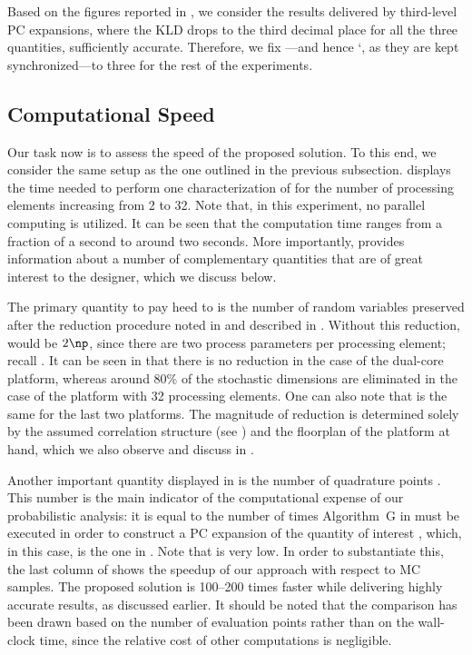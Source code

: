 Based on the figures reported in , we consider
the results delivered by third-level \ac{PC} expansions, where the \ac{KLD}
drops to the third decimal place for all the three quantities, sufficiently
accurate. Therefore, we fix \lc---and hence \lq, as they are kept
synchronized---to three for the rest of the experiments.

\subsection{Computational Speed}

Our task now is to assess the speed of the proposed solution. To this end, we
consider the same setup as the one outlined in the previous subsection.
 displays the time needed to perform one
characterization of \vg for the number of processing elements \np increasing
from 2 to 32. Note that, in this experiment, no parallel computing is utilized.
It can be seen that the computation time ranges from a fraction of a second to
around two seconds. More importantly,  provides
information about a number of complementary quantities that are of great
interest to the designer, which we discuss below.

The primary quantity to pay heed to is the number of random variables \nz
preserved after the reduction procedure noted in  and
described in . Without this reduction, \nz
would be $2 \np$, since there are two process parameters per processing element;
recall . It can be seen in
 that there is no reduction in the case of the
dual-core platform, whereas around 80\% of the stochastic dimensions are
eliminated in the case of the platform with 32 processing elements. One can also
note that \nz is the same for the last two platforms. The magnitude of reduction
is determined solely by the assumed correlation structure (see
) and the floorplan of the platform at
hand, which we also observe and discuss in .

Another important quantity displayed in  is the
number of quadrature points \nq. This number is the main indicator of the
computational expense of our probabilistic analysis: it is equal to the number
of times Algorithm~G in  must be executed in order to
construct a \ac{PC} expansion of the quantity of interest \g, which, in this
case, is the one in . Note that \nq is very
low. In order to substantiate this, the last column of
 shows the speedup of our approach with respect
to  \ac{MC} samples. The proposed solution is 100--200 times faster
while delivering highly accurate results, as discussed earlier. It should be
noted that the comparison has been drawn based on the number of evaluation
points rather than on the wall-clock time, since the relative cost of other
computations is negligible.

